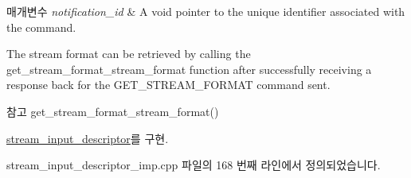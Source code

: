 \begin{DoxyParams}{매개변수}
{\em notification\+\_\+id} & A void pointer to the unique identifier associated with the command.\\
\hline
\end{DoxyParams}
The stream format can be retrieved by calling the get\+\_\+stream\+\_\+format\+\_\+stream\+\_\+format function after successfully receiving a response back for the G\+E\+T\+\_\+\+S\+T\+R\+E\+A\+M\+\_\+\+F\+O\+R\+M\+AT command sent.

\begin{DoxySeeAlso}{참고}
get\+\_\+stream\+\_\+format\+\_\+stream\+\_\+format() 
\end{DoxySeeAlso}


\hyperlink{classavdecc__lib_1_1stream__input__descriptor_a4ba58b32ff7b9f5d961a0a5eb46d4c6c}{stream\+\_\+input\+\_\+descriptor}를 구현.



stream\+\_\+input\+\_\+descriptor\+\_\+imp.\+cpp 파일의 168 번째 라인에서 정의되었습니다.


